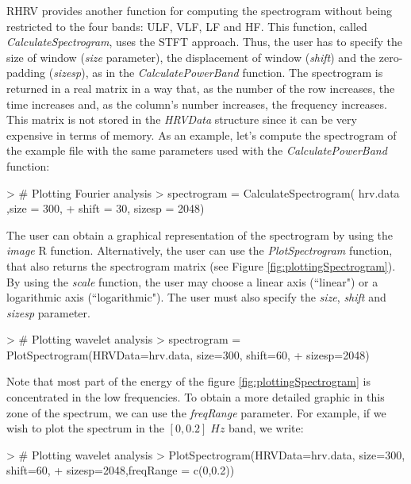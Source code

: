 \documentclass[12pt,lot, lof]{puthesis}
\begin{document}
RHRV provides another function for computing the spectrogram without being 
restricted to the four bands: \gls{ULF}, \gls{VLF}, \gls{LF} and \gls{HF}. This 
function, called \textit{CalculateSpectrogram}, uses the \gls{STFT} approach. 
Thus, the user has to specify the size of window (\textit{size} parameter), the 
displacement of window  (\textit{shift}) and the zero-padding 
(\textit{sizesp}), as in the \textit{CalculatePowerBand} function. The 
spectrogram is returned in a real matrix in a way that, as the number of the 
row increases, the time increases and, as the column's number increases, the 
frequency increases. This matrix
is not stored in the \textit{HRVData} structure since it can be very expensive 
in terms of 
memory. As an example, let's compute the spectrogram of the example file with 
the same parameters used with the \textit{CalculatePowerBand} function:
\begin{Schunk}
\begin{Sinput}
> # Plotting Fourier analysis
> spectrogram = CalculateSpectrogram( hrv.data ,size = 300,
+  shift = 30, sizesp = 2048)
\end{Sinput}
\end{Schunk}
The user can obtain a graphical representation of the spectrogram by using the 
\textit{image} R function. Alternatively, the user can use the 
\textit{PlotSpectrogram} function, that also returns the spectrogram matrix 
(see Figure \ref{fig:plottingSpectrogram}). By using the \textit{scale} 
function, the
user may choose a linear axis (``linear") or a logarithmic axis 
(``logarithmic"). The user must also specify the 
\textit{size}, \textit{shift} and \textit{sizesp} parameter. 
\begin{Schunk}
\begin{Sinput}
> # Plotting wavelet analysis
> spectrogram = PlotSpectrogram(HRVData=hrv.data, size=300, shift=60,
+  sizesp=2048)
\end{Sinput}
\end{Schunk}
Note that most part of the energy of the figure \ref {fig:plottingSpectrogram} 
is concentrated in the low frequencies. To obtain a more
detailed graphic in this zone of the spectrum, we can use the 
\textit{freqRange} parameter. For example, if we wish to plot the spectrum in 
the $[0,0.2]\;Hz$ band, we write:
\begin{Schunk}
\begin{Sinput}
> # Plotting wavelet analysis
> PlotSpectrogram(HRVData=hrv.data, size=300, shift=60, 
+ 	sizesp=2048,freqRange = c(0,0.2))
\end{Sinput}
\end{Schunk}
\end{document}
